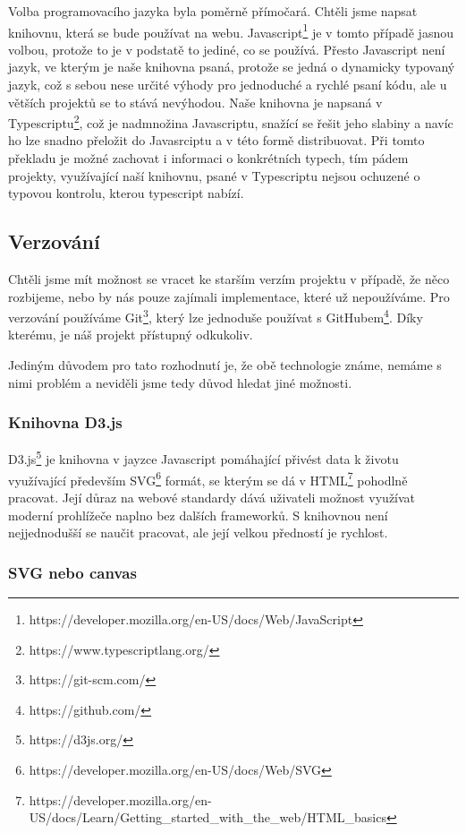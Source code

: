 Volba programovacího jazyka byla poměrně přímočará. Chtěli jsme napsat
knihovnu, která se bude používat na webu.
Javascript\footnote{https://developer.mozilla.org/en-US/docs/Web/JavaScript} je
v tomto případě jasnou volbou, protože to je v podstatě to jediné, co se
používá. Přesto Javascript není jazyk, ve kterým je naše knihovna psaná,
protože se jedná o dynamicky typovaný jazyk, což s sebou nese určité výhody pro
jednoduché a rychlé psaní kódu, ale u větších projektů se to stává nevýhodou.
Naše knihovna je napsaná v
Typescriptu\footnote{https://www.typescriptlang.org/}, což je nadmnožina
Javascriptu, snažící se řešit jeho slabiny a navíc ho lze snadno přeložit do
Javasrciptu a v této formě distribuovat. Při tomto překladu je možné zachovat i
informaci o konkrétních typech, tím pádem projekty, využívající naší knihovnu,
psané v Typescriptu nejsou ochuzené o typovou kontrolu, kterou typescript
nabízí.

\subsection{Verzování}

Chtěli jsme mít možnost se vracet ke starším verzím projektu v případě, že něco
rozbijeme, nebo by nás pouze zajímali implementace, které už nepoužíváme. Pro
verzování používáme Git\footnote{https://git-scm.com/}, který lze jednoduše
používat s GitHubem\footnote{https://github.com/}. Díky kterému, je náš projekt
přístupný odkukoliv.

Jediným důvodem pro tato rozhodnutí je, že obě technologie známe, nemáme s nimi
problém a neviděli jsme tedy důvod hledat jiné možnosti.

\subsubsection{Knihovna D3.js}

D3.js\footnote{https://d3js.org/} je knihovna v jayzce Javascript pomáhající
přivést data k životu využívající především
SVG\footnote{https://developer.mozilla.org/en-US/docs/Web/SVG} formát, se
kterým se dá v
HTML\footnote{https://developer.mozilla.org/en-US/docs/Learn/Getting\_started\_with\_the\_web/HTML\_basics}
pohodlně pracovat. Její důraz na webové standardy dává uživateli možnost
využívat moderní prohlížeče naplno bez dalších frameworků. S knihovnou není
nejjednodušší se naučit pracovat, ale její velkou předností je rychlost.

\subsubsection{SVG nebo canvas}

